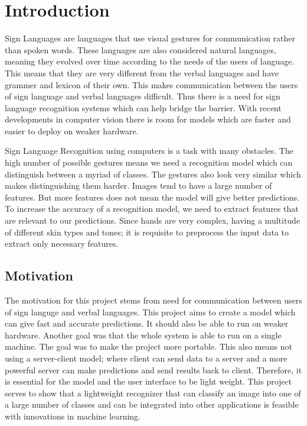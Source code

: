 \documentclass[a4paper,oneside,12pt]{report}
\date{\today}
\title{}
\begin{document}
\tableofcontents

\listoffigures

\chapter{Introduction}
\label{sec:orgee6f931}
Sign Languages are languages that use visual gestures for communication rather than spoken words. These languages are also considered natural languages, meaning they evolved over time according to the needs of the users of language. This means that they are very different from the verbal languages and have grammer and lexicon of their own. This makes communication between the users of sign language and verbal languages difficult. Thus there is a need for sign language recognition systems which can help bridge the barrier. With recent developments in computer vision there is room for models which are faster and easier to deploy on weaker hardware.

Sign Language Recognition using computers is a task with many obstacles. The high number of possible gestures means we need a recognition model which can distinguish between a myriad of classes. The gestures also look very similar which makes distinguishing them harder. Images tend to have a large number of features. But more features does not mean the model will give better predictions. To increase the accuracy of a recognition model, we need to extract features that are relevant to our predictions. Since hands are very complex, having a multitude of different skin types and tones; it is requisite to preprocess the input data to extract only necessary features.

\section{Motivation}
\label{sec:org983cade}
The motivation for this project stems from need for communication between users of sign languge and verbal languages. This project aims to create a model which can give fast and accurate predictions. It should also be able to run on weaker hardware. Another goal was that the whole system is able to run on a single machine. The goal was to make the project more portable. This also means not using a server-client model; where client can send data to a server and a more powerful server can make predictions and send results back to client. Therefore, it is essential for the model and the user interface to be light weight. This project serves to show that a lightweight recognizer that can classify an image into one of a large number of classes and can be integrated into other applications is feasible with innovations in machine learning.
\end{document}
